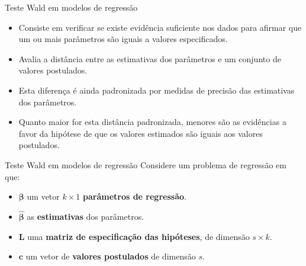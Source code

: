 \documentclass[
  ignorenonframetext,
  serif,
  professionalfont,
  usenames,
  dvipsnames,
  aspectratio = 169]{beamer}
\begin{document}
\begin{frame}{Teste Wald em modelos de regressão}
\protect\hypertarget{teste-wald-em-modelos-de-regressuxe3o}{}
\begin{itemize}
  \itemsep 2ex

  \item Consiste em verificar se existe evidência suficiente nos dados para afirmar que um ou mais parâmetros são iguais a valores especificados.
  
  \item Avalia a distância entre as estimativas dos parâmetros e um conjunto de valores postulados.
  
  \item Esta diferença é ainda padronizada por medidas de precisão das estimativas dos parâmetros. 

  \item Quanto maior for esta distância padronizada, menores são as evidências a favor da hipótese de que os valores estimados são iguais aos valores postulados.


  \end{itemize}
\end{frame}

\begin{frame}{Teste Wald em modelos de regressão}
\protect\hypertarget{teste-wald-em-modelos-de-regressuxe3o-1}{}
Considere um problema de regressão em que:

\begin{itemize}

  \itemsep 2ex
  
  \item $\boldsymbol{\beta}$ um vetor $k\times1$ \textbf{parâmetros de regressão}.
    
  \item $\boldsymbol{\hat\beta}$ as \textbf{estimativas} dos parâmetros.
    
  \item $\boldsymbol{L}$ uma \textbf{matriz de especificação das hipóteses}, de dimensão $s \times k$.  
  
  \item $\boldsymbol{c}$ um vetor de \textbf{valores postulados} de dimensão $s$.
    
  \end{itemize}
\end{frame}
\end{document}
